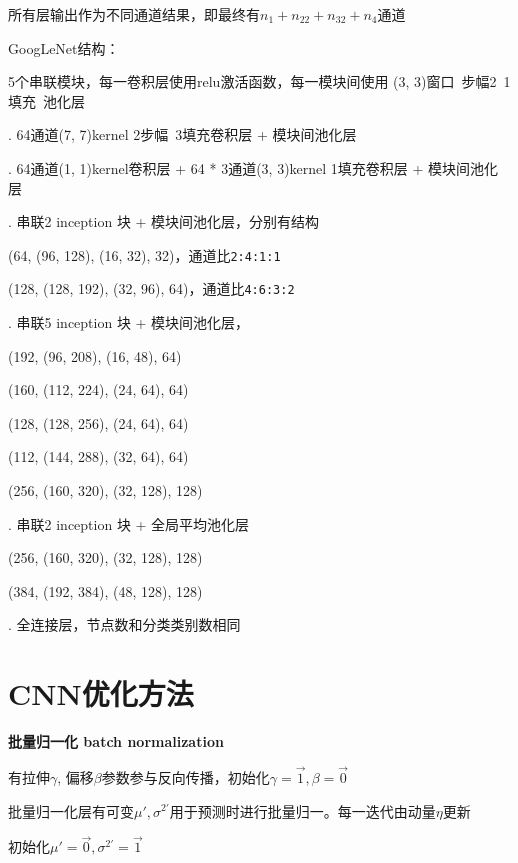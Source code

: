 \documentclass[UTF8]{ctexart}
\begin{document}
  \quad 所有层输出作为不同通道结果，即最终有$n_1 + n_{22} + n_{32} + n_4$通道

  GoogLeNet结构：

  \quad 5个串联模块，每一卷积层使用relu激活函数，每一模块间使用 (3, 3)窗口\ 步幅2\ 1填充\ 池化层

  . 64通道(7, 7)kernel 2步幅\ 3填充卷积层 + 模块间池化层

  . 64通道(1, 1)kernel卷积层 + 64 * 3通道(3, 3)kernel 1填充卷积层 + 模块间池化层

  . 串联2 inception 块 + 模块间池化层，分别有结构

  \quad \quad (64, (96, 128), (16, 32), 32)，通道比\texttt{2:4:1:1}

  \quad \quad (128, (128, 192), (32, 96), 64)，通道比\texttt{4:6:3:2}

  . 串联5 inception 块 + 模块间池化层，

  \quad \quad (192, (96, 208), (16, 48), 64)

  \quad \quad (160, (112, 224), (24, 64), 64)

  \quad \quad (128, (128, 256), (24, 64), 64)

  \quad \quad (112, (144, 288), (32, 64), 64)

  \quad \quad (256, (160, 320), (32, 128), 128)

  . 串联2 inception 块 + 全局平均池化层

  \quad \quad (256, (160, 320), (32, 128), 128)

  \quad \quad (384, (192, 384), (48, 128), 128)

  . 全连接层，节点数和分类类别数相同

\section{CNN优化方法}
\noindent \textbf{批量归一化 batch normalization}

  有拉伸$\gamma$, 偏移$\beta$参数参与反向传播，初始化$\gamma = \vec{1}, \beta = \vec{0}$

  批量归一化层有可变$\mu', \sigma^{2'}$用于预测时进行批量归一。每一迭代由动量$\eta$更新
  
  \quad 初始化$\mu' = \vec{0}, \sigma^{2'} = \vec{1}$
\end{document}
